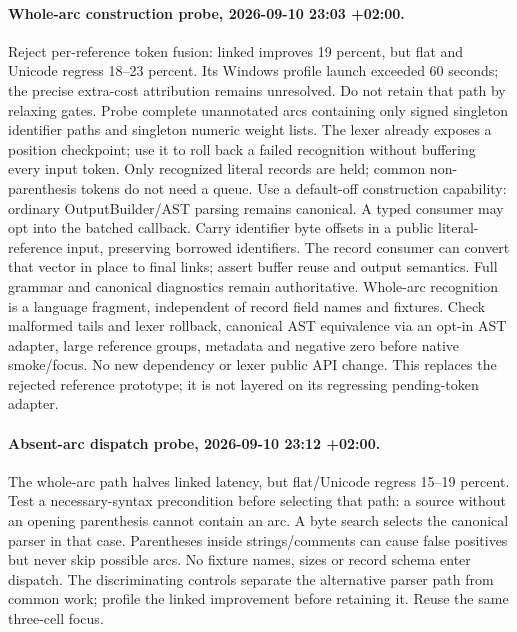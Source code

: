 \documentclass[11pt,a4paper]{article}
\begin{document}
\paragraph{Whole-arc construction probe, 2026-09-10 23:03 +02:00.}
Reject per-reference token fusion: linked improves 19 percent, but flat and Unicode
regress 18--23 percent. Its Windows profile launch exceeded 60 seconds; the precise
extra-cost attribution remains unresolved. Do not retain that path by relaxing gates.
Probe complete unannotated arcs containing only signed singleton identifier paths
and singleton numeric weight lists. The lexer already exposes a position checkpoint;
use it to roll back a failed recognition without buffering every input token. Only
recognized literal records are held; common non-parenthesis tokens do not need a queue.
Use a default-off construction capability: ordinary OutputBuilder/AST parsing remains
canonical. A typed consumer may opt into the batched callback. Carry identifier byte
offsets in a public literal-reference input, preserving borrowed identifiers. The record
consumer can convert that vector in place to final links; assert buffer reuse and output
semantics. Full grammar and canonical diagnostics remain authoritative. Whole-arc
recognition is a language fragment, independent of record field names and fixtures.
Check malformed tails and lexer rollback, canonical AST equivalence via an opt-in AST
adapter, large reference groups, metadata and negative zero before native smoke/focus.
No new dependency or lexer public API change. This replaces the rejected reference
prototype; it is not layered on its regressing pending-token adapter.

\paragraph{Absent-arc dispatch probe, 2026-09-10 23:12 +02:00.}
The whole-arc path halves linked latency, but flat/Unicode regress 15--19 percent.
Test a necessary-syntax precondition before selecting that path: a source without
an opening parenthesis cannot contain an arc. A byte search selects the canonical
parser in that case. Parentheses inside strings/comments can cause false positives
but never skip possible arcs. No fixture names, sizes or record schema enter dispatch.
The discriminating controls separate the alternative parser path from common work;
profile the linked improvement before retaining it. Reuse the same three-cell focus.
\end{document}
